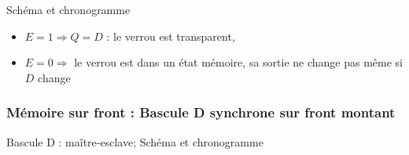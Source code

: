 \documentclass{beamer}
\begin{document}
\begin{frame}
\begin{block}{Schéma et chronogramme}
\begin{framed}
\begin{itemize}
\item $E=1 \Rightarrow Q = D$ : le verrou est transparent,
\item $E=0 \Rightarrow $ le verrou est dans un état mémoire, sa sortie ne change pas même si $D$ change
\end{itemize}
\end{framed}

\end{block}
\end{frame}


\begin{frame}
\frametitle{Mémoire sur front : Bascule D synchrone sur front montant}
\begin{block}{Bascule D : maître-esclave; Schéma et chronogramme}


\end{block}
\end{frame}
\end{document}
